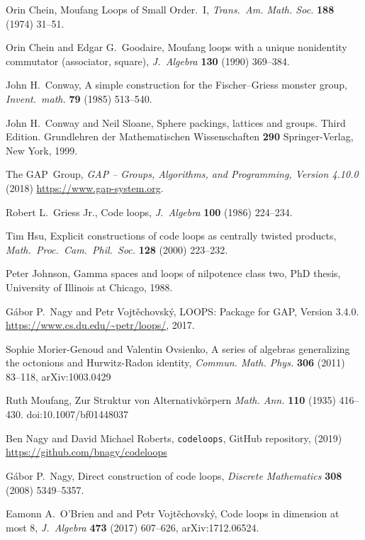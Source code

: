 \documentclass{article}
\theoremstyle{plain}
\theoremstyle{definition}
\begin{document}
\begin{thebibliography}{1}
 Orin Chein, Moufang Loops of Small Order.\ I, \emph{Trans.\ Am. Math. Soc.} \textbf{188} (1974) 31--51.

 Orin Chein and Edgar G.\ Goodaire, Moufang loops with a unique nonidentity commutator (associator, square), \emph{J.\ Algebra} \textbf{130} (1990) 369--384.

 John H.\ Conway, A simple construction for the Fischer--Griess monster group, \emph{Invent.\ math.} \textbf{79} (1985) 513--540.

 John H.\ Conway and Neil Sloane, Sphere packings, lattices and groups. Third Edition. Grundlehren der Mathematischen Wissenschaften \textbf{290} Springer-Verlag, New York, 1999.

 The GAP~Group, \emph{GAP -- Groups, Algorithms, and Programming, Version 4.10.0} (2018) \url{https://www.gap-system.org}.

 Robert L.\ Griess Jr., Code loops, \emph{J.\ Algebra} \textbf{100} (1986) 224--234.

 Tim Hsu, Explicit constructions of code loops as centrally twisted products, \emph{Math.\ Proc.\ Cam.\ Phil.\ Soc.} \textbf{128} (2000) 223--232.

 Peter Johnson, Gamma spaces and loops of nilpotence class two, PhD thesis, University of Illinois at Chicago, 1988.

 G\'abor P.\ Nagy and Petr Vojt\v{e}chovsk\'{y}, LOOPS: Package for GAP, Version 3.4.0. \url{https://www.cs.du.edu/~petr/loops/}, 2017.

 Sophie Morier-Genoud and Valentin Ovsienko, A series of algebras generalizing the octonions and Hurwitz-Radon identity, \emph{Commun. Math. Phys.} \textbf{306} (2011) 83--118, arXiv:1003.0429

 Ruth Moufang, Zur Struktur von Alternativk\"orpern \emph{Math. Ann.} \textbf{110} (1935) 416--430. doi:10.1007/bf01448037

 Ben Nagy and David Michael Roberts, \texttt{codeloops}, GitHub repository, (2019) \url{https://github.com/bnagy/codeloops}

 G\'abor P.\ Nagy, Direct construction of code loops, \emph{Discrete Mathematics} \textbf{308} (2008) 5349--5357.

 Eamonn A.\ O'Brien and and Petr Vojt\v{e}chovsk\'{y}, Code loops in dimension at most 8, \emph{J.\ Algebra} \textbf{473} (2017) 607--626, arXiv:1712.06524.

\end{thebibliography}
\end{document}
